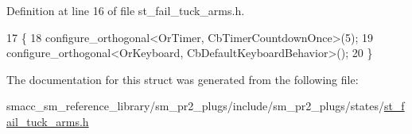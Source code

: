 Definition at line 16 of file st\+\_\+fail\+\_\+tuck\+\_\+arms.\+h.


\begin{DoxyCode}
17     \{
18         configure\_orthogonal<OrTimer,  CbTimerCountdownOnce>(5);    
19         configure\_orthogonal<OrKeyboard, CbDefaultKeyboardBehavior>();
20     \}
\end{DoxyCode}


The documentation for this struct was generated from the following file\+:\begin{DoxyCompactItemize}
\item 
smacc\+\_\+sm\+\_\+reference\+\_\+library/sm\+\_\+pr2\+\_\+plugs/include/sm\+\_\+pr2\+\_\+plugs/states/\hyperlink{st__fail__tuck__arms_8h}{st\+\_\+fail\+\_\+tuck\+\_\+arms.\+h}\end{DoxyCompactItemize}

